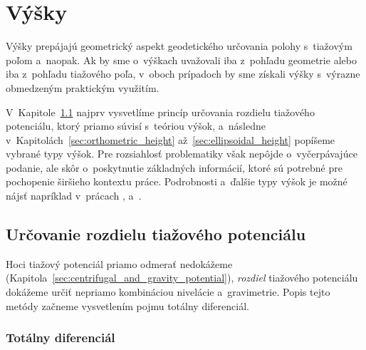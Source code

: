 \documentclass[a4paper, 12pt]{book}
\begin{document}
\section{Výšky}
\label{sec:heights}

Výšky prepájajú geometrický aspekt geodetického určovania polohy s~tiažovým 
poľom a~naopak.  Ak by sme o~výškach uvažovali iba z~pohľadu geometrie alebo 
iba z~pohľadu tiažového poľa, v~oboch prípadoch by sme získali výšky s~výrazne 
obmedzeným praktickým využitím.

V~Kapitole~\ref{sec:potential_differences} najprv vysvetlíme princíp určovania 
rozdielu tiažového potenciálu, ktorý priamo súvisí s~teóriou výšok, a~následne 
v~Kapitolách~\ref{sec:orthometric_height} až~\ref{sec:ellipsoidal_height} 
popíšeme vybrané typy výšok.  Pre rozsiahlosť problematiky však nepôjde 
o~vyčerpávajúce podanie, ale skôr o~poskytnutie základných informácií, ktoré sú 
potrebné pre pochopenie širšieho kontextu práce.  Podrobnosti a~ďalšie typy 
výšok je možné nájsť napríklad v~prácach \textcite{Jekeli2000a}, 
\textcite{MoritzPhysicalGeodesy} a~\textcite{SansoGeodeticHeights}.

\subsection{Určovanie rozdielu tiažového potenciálu}
\label{sec:potential_differences}

Hoci tiažový potenciál priamo odmerať nedokážeme 
(Kapitola~\ref{sec:centrifugal_and_gravity_potential}), \emph{rozdiel} 
tiažového potenciálu dokážeme určiť nepriamo kombináciou nivelácie 
a~gravimetrie.  Popis tejto metódy začneme vysvetlením pojmu totálny 
diferenciál.

\subsubsection{Totálny diferenciál}
\label{sec:total_diferential}
\end{document}
